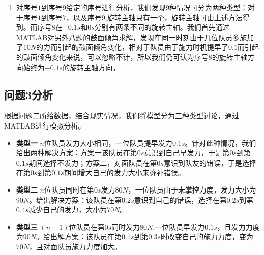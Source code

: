 \documentclass{cumcm}
\begin{document}
\begin{enumerate}
\item 对序号$1$到序号$9$给定的序号进行分析，我们发现$9$种情况可分为两种类型：对于序号$1$到序号$7$，以及序号$9$,旋转主轴只有一个，旋转主轴可由上述方法得到。而序号$8$在$-0.1s$和$0s$分别有两条不同的旋转主轴。我们首先通过MATLAB对另外八题的鼓面倾角求解，发现在同一时刻由于几位队员多施加了$10N$的力而引起的鼓面倾角变化，相对于队员由于施力时机提早了$0.1$而引起的鼓面倾角变化来说，可以忽略不计，所以我们仍可认为序号$8$的旋转主轴方向始终为$-0.1s$的旋转主轴方向。
\end{enumerate}

\subsection{问题3分析}
根据问题二所给数据，结合现实情况，我们将模型分为三种类型讨论，通过MATLAB进行模拟分析。
\begin{itemize}
\item \textbf{类型一} \quad $n$位队员发力大小相同，一位队员提早发力$0.1s$。针对此种情况，我们给出两种解决方案：方案一该队员在第$0s$意识到自己早发力，于是第$0s$到第$0.1s$期间选择不发力；方案二，对面队员在第$0s$意识到队友的错误，于是选择在第$0s$到第$0.1s$期间增大自己的发力大小来弥补错误。
\item \textbf{类型二} \quad $n$位队员同时在第$0s$发力$80N$，一位队员由于未掌控力度，发力大小为$90N$。给出解决方案：该队员在第$0.2s$意识到自己的错误，选择在第$0.2s$到第$0.4s$减少自己的发力，大小为$70N$。
\item \textbf{类型三} \quad $(n-1)$位队员在第$0s$同时发力$80N$,一位队员早发力$0.1s$，且发力力度为$90N$。给出解方案：该队员在第$0.1s$到第$0.3s$时改变自己的施力力度，变为$70N$，且对面队员施力力度加大。
\end{itemize}
\end{document}
